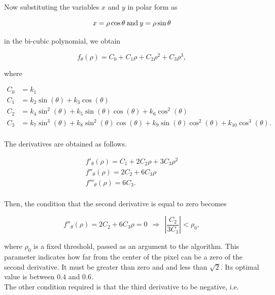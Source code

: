\documentclass{ipol}
\numberwithin{equation}{section}
\numberwithin{table}{section}
\numberwithin{figure}{section}
\begin{document}
Now substituting the variables $x$ and $y$ in polar form as

\begin{equation*}
	x = \rho\cos{\theta} \: \text{and} \: y = \rho\sin{\theta} \\
\end{equation*}

in the bi-cubic polynomial, we obtain

\begin{equation}
	f_{\theta}(\rho) = C_0 + C_1\rho + C_2\rho^2 + C_3\rho^3 ,
\end{equation}

where

\begin{align}
\label{eq:c}
	C_0 & = k_1 \nonumber \nonumber \\
	C_1 & = k_2\sin(\theta) + k_3\cos(\theta) \nonumber \\
	C_2 & = k_4\sin^2(\theta) + k_5\sin(\theta)\cos(\theta) + k_6\cos^2(\theta) \nonumber \\
	C_3 & = k_7\sin^3(\theta) + k_8\sin^2(\theta)\cos(\theta) + k_9\sin(\theta)\cos^2(\theta) + k_{10}\cos^3(\theta). \nonumber \\
\end{align}

The derivatives are obtained as follows.

\begin{align}
	f'_{\theta}(\rho) = C_1 + 2C_2\rho + 3C_3\rho^2 \nonumber \\
	f''_{\theta}(\rho) = 2C_2 + 6C_3\rho \nonumber \\
	f'''_{\theta}(\rho) = 6C_3 .\nonumber \\
\end{align}

Then, the condition that the second derivative is equal to zero becomes

\begin{equation}
	f''_{\theta}(\rho) = 2C_2 + 6C_3\rho = 0 \ \ \Rightarrow \ \ \left| \frac{C_2}{3C_3} \right| < \rho_0,
\end{equation}

where $\rho_0$ is a fixed threshold, passed as an argument to the algorithm. This parameter indicates how far 
from the center of the pixel can be a zero of the second derivative. It must be greater than zero and and 
less than $\sqrt{2}$. Its optimal value is between $0.4$ and $0.6$.\\

The other condition required is that the third derivative to be negative, i.e.\
\end{document}
